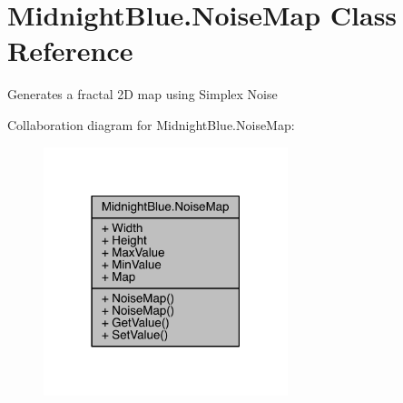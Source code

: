\hypertarget{class_midnight_blue_1_1_noise_map}{}\section{Midnight\+Blue.\+Noise\+Map Class Reference}
\label{class_midnight_blue_1_1_noise_map}


Generates a fractal 2D map using Simplex Noise  




Collaboration diagram for Midnight\+Blue.\+Noise\+Map\+:\nopagebreak
\begin{figure}[H]
\begin{center}
\leavevmode
\includegraphics[width=202pt]{class_midnight_blue_1_1_noise_map__coll__graph}
\end{center}
\end{figure}
